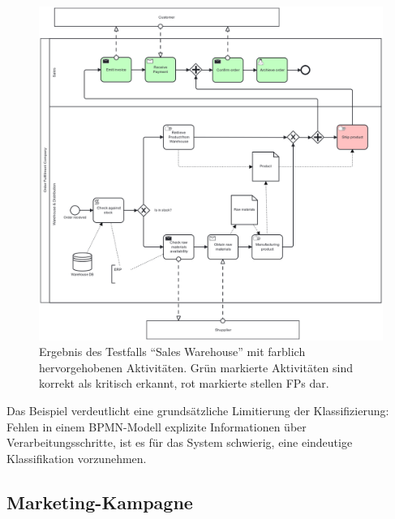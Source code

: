 \begin{figure}
    \centering
    \includegraphics[height=.41\textheight]{images/results/examples/qwen3-235B-run-3-uni-sales-warehouse}
    \caption{Ergebnis des Testfalls \enquote{Sales Warehouse} mit farblich hervorgehobenen Aktivitäten. Grün markierte Aktivitäten sind korrekt als kritisch erkannt, rot markierte stellen \acp{FP} dar.}
    \label{fig:qwen3-fall}
\end{figure}

Das Beispiel verdeutlicht eine grundsätzliche Limitierung der Klassifizierung: Fehlen in einem \ac{BPMN}-Modell explizite Informationen über Verarbeitungsschritte, ist es für das System schwierig, eine eindeutige Klassifikation vorzunehmen.

\subsection*{Marketing-Kampagne}

